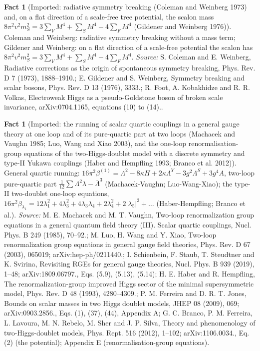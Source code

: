 \documentclass[11pt]{article}
\theoremstyle{definition}
\newtheorem{fact}[theorem]{Fact}
\theoremstyle{plain}
\begin{document}
\begin{fact}[Imported: radiative symmetry breaking (Coleman and Weinberg 1973) and, on a flat direction of a scale-free tree potential, the scalon mass $8\pi^{2}v^{2}m_{S}^{2} = 3\sum_{V}M^{4} + \sum_{S}M^{4} - 4\sum_{F}M^{4}$ (Gildener and Weinberg 1976)]\label{c:synthesis.imported-coleman-weinberg-gildener-weinberg-scalon-mass}
Coleman and Weinberg: radiative symmetry breaking without a mass term; Gildener and Weinberg: on a flat direction of a scale-free potential the scalon has $8\pi^{2}v^{2}m_{S}^{2} = 3\sum_{V}M^{4} + \sum_{S}M^{4} - 4\sum_{F}M^{4}$.
\emph{Source:} S. Coleman and E. Weinberg, Radiative corrections as the origin of spontaneous symmetry breaking, Phys. Rev. D 7 (1973), 1888--1910.; E. Gildener and S. Weinberg, Symmetry breaking and scalar bosons, Phys. Rev. D 13 (1976), 3333.; R. Foot, A. Kobakhidze and R. R. Volkas, Electroweak Higgs as a pseudo-Goldstone boson of broken scale invariance, arXiv:0704.1165, equations (10) to (14)..
\end{fact}

\begin{fact}[Imported: the running of scalar quartic couplings in a general gauge theory at one loop and of its pure-quartic part at two loops (Machacek and Vaughn 1985; Luo, Wang and Xiao 2003), and the one-loop renormalisation-group equations of the two-Higgs-doublet model with a discrete symmetry and type-II Yukawa couplings (Haber and Hempfling 1993; Branco et al. 2012)]\label{c:synthesis.imported-general-quartic-running-and-two-doublet-renormalisation-group-equations}
General quartic running: $16\pi^{2}\beta^{(1)} = \Lambda^{2} - 8\kappa H + 2\kappa\Lambda^{Y} - 3g^{2}\Lambda^{S} + 3g^{4}A$, two-loop pure-quartic part $\tfrac{1}{12}\sum\Lambda^{2}\lambda - \bar{\Lambda}^{3}$ (Machacek-Vaughn; Luo-Wang-Xiao); the type-II two-doublet one-loop equations, $16\pi^{2}\beta_{\lambda_{1}} = 12\lambda_{1}^{2} + 4\lambda_{3}^{2} + 4\lambda_{3}\lambda_{4} + 2\lambda_{4}^{2} + 2|\lambda_{5}|^{2} + \ldots$ (Haber-Hempfling; Branco et al.).
\emph{Source:} M. E. Machacek and M. T. Vaughn, Two-loop renormalization group equations in a general quantum field theory (III). Scalar quartic couplings, Nucl. Phys. B 249 (1985), 70--92.; M. Luo, H. Wang and Y. Xiao, Two-loop renormalization group equations in general gauge field theories, Phys. Rev. D 67 (2003), 065019; arXiv:hep-ph/0211440.; I. Schienbein, F. Staub, T. Steudtner and K. Svirina, Revisiting RGEs for general gauge theories, Nucl. Phys. B 939 (2019), 1--48; arXiv:1809.06797., Eqs. (5.9), (5.13), (5.14); H. E. Haber and R. Hempfling, The renormalization-group improved Higgs sector of the minimal supersymmetric model, Phys. Rev. D 48 (1993), 4280--4309.; P. M. Ferreira and D. R. T. Jones, Bounds on scalar masses in two Higgs doublet models, JHEP 08 (2009), 069; arXiv:0903.2856., Eqs. (1), (37), (44), Appendix A; G. C. Branco, P. M. Ferreira, L. Lavoura, M. N. Rebelo, M. Sher and J. P. Silva, Theory and phenomenology of two-Higgs-doublet models, Phys. Rept. 516 (2012), 1--102; arXiv:1106.0034., Eq. (2) (the potential); Appendix E (renormalisation-group equations).
\end{fact}
\end{document}
